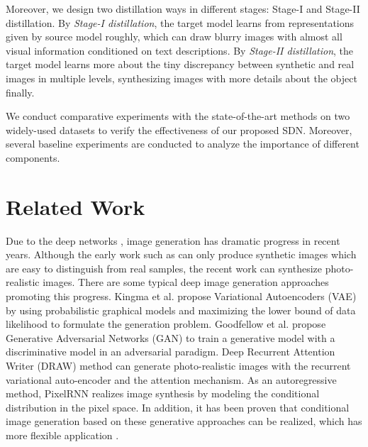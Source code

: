 \documentclass[sigconf]{acmart}
\begin{document}
Moreover, we design two distillation ways in different stages: Stage-I and Stage-II distillation. By \textit{Stage-I distillation}, the target model learns from representations given by source model roughly, which can draw blurry images with almost all visual information conditioned on text descriptions. By \textit{Stage-II distillation}, the target model learns more about the tiny discrepancy between synthetic and real images in multiple levels, synthesizing images with more details about the object finally.

We conduct comparative experiments with the state-of-the-art methods on two widely-used datasets to verify the effectiveness of our proposed SDN. Moreover, several baseline experiments are conducted to analyze the importance of different components.

\section{Related Work}

Due to the deep networks \cite{lecun2015deep}, image generation has dramatic progress in recent years. Although the early work such as \cite{mnih2010generating} can only produce synthetic images which are easy to distinguish from real samples, the recent work \cite{nguyen2016synthesizing, zhang2016stackgan, chen2017photographic} can synthesize photo-realistic images. There are some typical deep image generation approaches promoting this progress. Kingma et al. propose Variational Autoencoders (VAE) \cite{kingma2013auto} by using probabilistic graphical models and maximizing the lower bound of data likelihood to formulate the generation problem. Goodfellow et al. propose Generative Adversarial Networks (GAN) \cite{goodfellow2014generative} to train a generative model with a discriminative model in an adversarial paradigm. Deep Recurrent Attention Writer (DRAW) method \cite{gregor2015draw} can generate photo-realistic images with the recurrent variational auto-encoder and the attention mechanism. As an autoregressive method, PixelRNN \cite{oord2016pixel} realizes image synthesis by modeling the conditional distribution in the pixel space. In addition, it has been proven that conditional image generation based on these generative approaches can be realized, which has more flexible application \cite{van2016conditional, yan2016attribute2image}.
\end{document}
